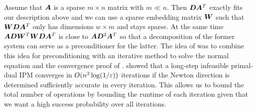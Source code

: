 Assume that \(\bm{A}\) is a sparse \(m \times n\) matrix with \(m \ll n\).
Then \(\bm{D} \bm{A}^T\) exactly fits our description above and we can use a sparse embedding matrix \(\bm{W}\) such that \(\bm{W}\bm{D}\bm{A}^T\) only has dimensions \(w \times m\) and stays sparse.
At the same time \(\bm{A}\bm{D}\bm{W}^T \bm{W} \bm{D}\bm{A}^T\) is close to \(\bm{A}\bm{D}^2 \bm{A}^T\) so that a decomposition of the former system can serve as a preconditioner for the latter.
The idea of \textcite{Avron-FasterRandomizedInfeasibleIPMs} was to combine this idea for preconditioning with an iterative method to solve the normal equation and the convergence proof of \textcite{Monteiro-ConvergenceAnalysisLongStepInfeasibleIPMs}.
\textcite{Monteiro-ConvergenceAnalysisLongStepInfeasibleIPMs} showed that a long-step infeasible primal-dual IPM converges in \(O(n^2 \log(1/\varepsilon))\) iterations if the Newton direction is determined sufficiently accurate in every iteration.
This allows us to bound the total number of operations by bounding the runtime of each iteration given that we want a high success probability over all iterations.

